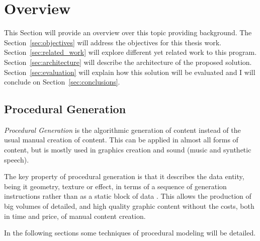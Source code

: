 
% 
% 

\section{Overview} %
\label{sec:overview}


This Section will provide an overview over this topic providing background. The Section~\ref{sec:objectives} will address the objectives for this thesis work. Section~\ref{sec:related_work} will explore different yet related work to this program. Section~\ref{sec:architecture} will describe the architecture of the proposed solution. Section~\ref{sec:evaluation} will explain how this solution will be evaluated and I will conclude on Section~\ref{sec:conclusions}.

\subsection{Procedural Generation} %
\label{sub:procedural_generation}

\emph{Procedural Generation} is the algorithmic generation of content instead of the usual manual creation of content. This can be applied in almost all forms of content, but is mostly used in graphics creation and sound (music and synthetic speech).

The key property of procedural generation is that it describes the data entity, being it geometry, texture or effect, in terms of a sequence of generation instructions rather than as a static block of data \cite{Kelly}. This allows the production of big volumes of detailed, and high quality graphic content without the costs, both in time and price, of manual content creation.

In the following sections some techniques of procedural modeling will be detailed.








